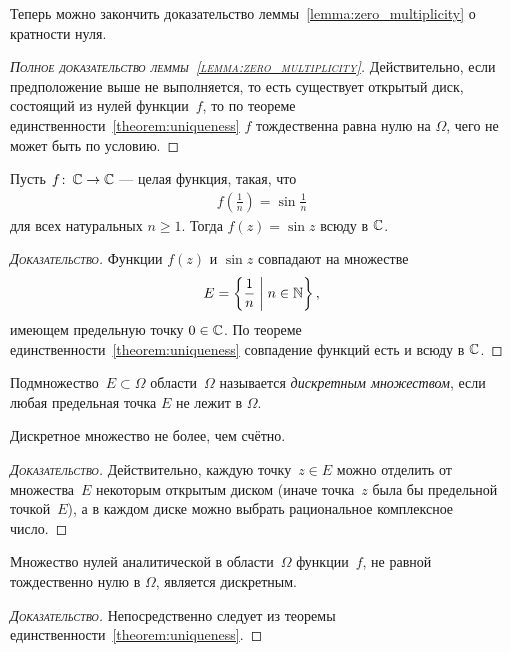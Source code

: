 \documentclass[../complex-analysis.tex]{subfiles}
\begin{document}
Теперь можно закончить доказательство леммы~\ref{lemma:zero_multiplicity} о кратности нуля.

\begin{proof}[\normalfont\textsc{Полное доказательство леммы~\ref{lemma:zero_multiplicity}}]
 Действительно, если предположение выше не выполняется, то есть существует открытый диск, состоящий из нулей функции~$ f $, то по теореме единственности~\ref{theorem:uniqueness} $ f $ тождественна равна нулю на $ \Omega $, чего не может быть по условию.
\end{proof}

\begin{exmpl}
 Пусть $ f\colon\,\mathbb{C}\to\mathbb{C} $ --- целая функция, такая, что
 \begin{align*}
  f \left( \frac{1}{n} \right) = \sin \frac{1}{n}
 \end{align*} для всех натуральных $ n \geqslant 1 $. Тогда $ f(z) = \sin z $ всюду в $ \mathbb{C} $.
\end{exmpl}
\begin{proof}[\normalfont\textsc{Доказательство}]
 Функции $ f(z) $ и $ \sin z $ совпадают на множестве
 \begin{align*}
  E = \left\{ \frac{1}{n} \;\middle|\; n \in \mathbb{N} \right\},
 \end{align*} имеющем предельную точку $ 0 \in \mathbb{C} $. По теореме единственности~\ref{theorem:uniqueness} совпадение функций есть и всюду в $ \mathbb{C} $.
\end{proof}

\begin{df}
 Подмножество~$ E \subset \Omega $ области~$ \Omega $ называется \emph{дискретным множеством}, если любая предельная точка $ E $ не лежит в $ \Omega $.
\end{df}
\begin{prop}
 Дискретное множество не более, чем счётно.
\end{prop}
\begin{proof}[\normalfont\textsc{Доказательство}]
 Действительно, каждую точку~$ z \in E $ можно отделить от множества~$ E $ некоторым открытым диском (иначе точка~$ z $ была бы предельной точкой~$ E $), а в каждом диске можно выбрать рациональное комплексное число.
\end{proof}

\begin{crly}
 Множество нулей аналитической в области~$ \Omega $ функции~$ f $, не равной тождественно нулю в $ \Omega $, является дискретным.
\end{crly}
\begin{proof}[\normalfont\textsc{Доказательство}]
 Непосредственно следует из теоремы единственности~\ref{theorem:uniqueness}.
\end{proof}
\end{document}
